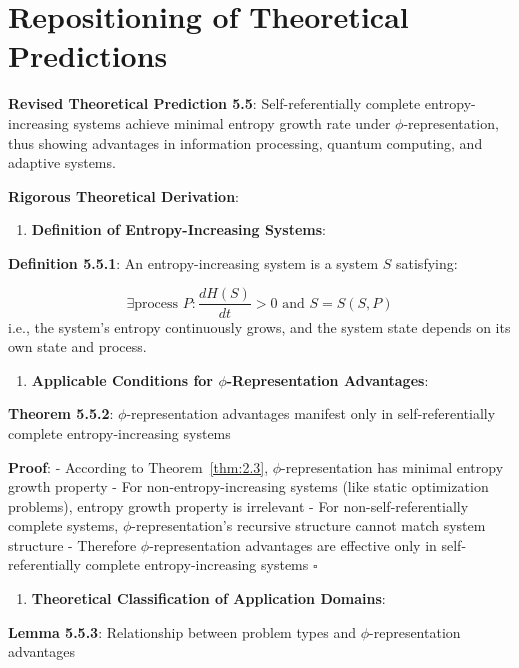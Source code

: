 \section{Repositioning of Theoretical Predictions}
\label{sec:ch05_applications:repositioning-of-theoretical-predictions}

\textbf{Revised Theoretical Prediction 5.5}: Self-referentially complete entropy-increasing systems achieve minimal entropy growth rate under $\phi$-representation, thus showing advantages in information processing, quantum computing, and adaptive systems.

\textbf{Rigorous Theoretical Derivation}:

\begin{enumerate}
\item \textbf{Definition of Entropy-Increasing Systems}:
\end{enumerate}
   \textbf{Definition 5.5.1}: An entropy-increasing system is a system $S$ satisfying:
\label{def:5.5.1}
   
\begin{equation}
\exists \text{process } P: \frac{dH(S)}{dt} > 0 \text{ and } S = S(S, P)
\end{equation}
   i.e., the system's entropy continuously grows, and the system state depends on its own state and process.

\begin{enumerate}
\item \textbf{Applicable Conditions for $\phi$-Representation Advantages}:
\end{enumerate}
   \textbf{Theorem 5.5.2}: $\phi$-representation advantages manifest only in self-referentially complete entropy-increasing systems
\label{thm:5.5.2}
   
   \textbf{Proof}:
   - According to Theorem~\ref{thm:2.3}, $\phi$-representation has minimal entropy growth property
   - For non-entropy-increasing systems (like static optimization problems), entropy growth property is irrelevant
   - For non-self-referentially complete systems, $\phi$-representation's recursive structure cannot match system structure
   - Therefore $\phi$-representation advantages are effective only in self-referentially complete entropy-increasing systems $\square$

\begin{enumerate}
\item \textbf{Theoretical Classification of Application Domains}:
\end{enumerate}
   \textbf{Lemma 5.5.3}: Relationship between problem types and $\phi$-representation advantages
\label{lemma:5.5.3}
   
